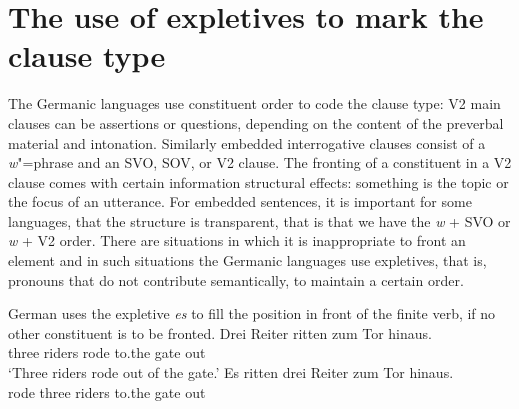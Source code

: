 \section{The use of expletives to mark the clause type}

The Germanic languages use constituent order to code the clause type: V2 main clauses can be
assertions or questions, depending on the content of the preverbal material and
intonation. Similarly embedded interrogative clauses consist of a \emph{w}"=phrase and an SVO, SOV,
or V2 clause. The fronting of a constituent in a V2 clause comes with certain information structural
effects: something is the topic or the focus of an utterance. For embedded sentences, it is important
for some languages, that the structure is transparent, that is that we have the \emph{w} + SVO or
\emph{w} + V2 order. There are situations in which it is inappropriate to front an element and in
such situations the Germanic languages use expletives, that is, pronouns that do not contribute
semantically, to maintain a certain order.

German uses the expletive \emph{es} to fill the position in front of the finite verb, if no other
constituent is to be fronted.
\eal
\ex 
\gll Drei Reiter ritten zum Tor hinaus.\\
     three riders rode  to.the gate out\\\german
\glt `Three riders rode out of the gate.'
\ex 
\gll Es ritten drei Reiter zum Tor hinaus.\\
     \expl{} rode   three riders to.the gate out\\
\zl


